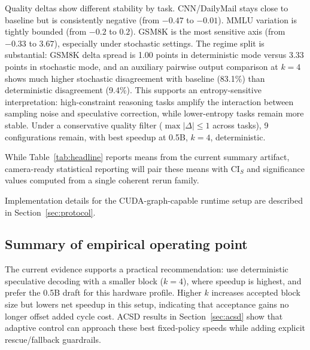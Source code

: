 Quality deltas show different stability by task. CNN/DailyMail stays close to
baseline but is consistently negative (from $-0.47$ to $-0.01$). MMLU
variation is tightly bounded (from $-0.2$ to $0.2$). GSM8K is the most
sensitive axis (from $-0.33$ to $3.67$), especially under stochastic settings.
The regime split is substantial: GSM8K delta spread is 1.00 points in
deterministic mode versus 3.33 points in stochastic mode, and an auxiliary
pairwise output comparison at $k{=}4$ shows much higher stochastic
disagreement with baseline (83.1\%) than deterministic disagreement (9.4\%).
This supports an entropy-sensitive interpretation: high-constraint reasoning
tasks amplify the interaction between sampling noise and speculative
correction, while lower-entropy tasks remain more stable.
Under a conservative quality filter ($\max |\Delta| \le 1$ across tasks),
9 configurations remain, with best speedup at 0.5B, $k{=}4$, deterministic.

While Table~\ref{tab:headline} reports means from the current summary artifact,
camera-ready statistical reporting will pair these means with CI$_S$ and
significance values computed from a single coherent rerun family.

Implementation details for the CUDA-graph-capable runtime setup are described
in Section~\ref{sec:protocol}.

\subsection{Summary of empirical operating point}

The current evidence supports a practical recommendation: use deterministic
speculative decoding with a smaller block ($k{=}4$), where speedup is highest,
and prefer the 0.5B draft for this hardware profile. Higher $k$ increases
accepted block size but lowers net speedup in this setup, indicating that
acceptance gains no longer offset added cycle cost. ACSD results in
Section~\ref{sec:acsd} show that adaptive control can approach these best
fixed-policy speeds while adding explicit rescue/fallback guardrails.
